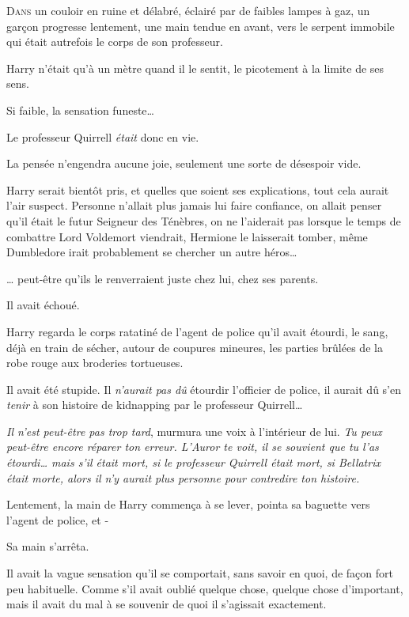 
\lettrine{D}{ans} un couloir en ruine et délabré, éclairé par de faibles lampes à gaz, un garçon progresse lentement, une main tendue en avant, vers le serpent immobile qui était autrefois le corps de son professeur.

Harry n'était qu'à un mètre quand il le sentit, le picotement à la limite de ses sens.

Si faible, la sensation funeste…

Le professeur Quirrell \emph{était} donc en vie.

La pensée n'engendra aucune joie, seulement une sorte de désespoir vide.

Harry serait bientôt pris, et quelles que soient ses explications, tout cela aurait l'air suspect. Personne n'allait plus jamais lui faire confiance, on allait penser qu'il était le futur Seigneur des Ténèbres, on ne l'aiderait pas lorsque le temps de combattre Lord Voldemort viendrait, Hermione le laisserait tomber, même Dumbledore irait probablement se chercher un autre héros…

… peut-être qu'ils le renverraient juste chez lui, chez ses parents.

Il avait échoué.

Harry regarda le corps ratatiné de l'agent de police qu'il avait étourdi, le sang, déjà en train de sécher, autour de coupures mineures, les parties brûlées de la robe rouge aux broderies tortueuses.

Il avait été stupide. Il \emph{n'aurait pas dû} étourdir l'officier de police, il aurait dû s'en \emph{tenir} à son histoire de kidnapping par le professeur Quirrell…

\emph{Il n'est peut-être pas trop tard}, murmura une voix à l'intérieur de lui. \emph{Tu peux peut-être encore réparer ton erreur. L'Auror te voit, il se souvient que tu l'as étourdi… mais s'il était mort, si le professeur Quirrell était mort, si Bellatrix était morte, alors il n'y aurait plus personne pour contredire ton histoire.}

Lentement, la main de Harry commença à se lever, pointa sa baguette vers l'agent de police, et -

Sa main s'arrêta.

Il avait la vague sensation qu'il se comportait, sans savoir en quoi, de façon fort peu habituelle. Comme s'il avait oublié quelque chose, quelque chose d'important, mais il avait du mal à se souvenir de quoi il s'agissait exactement.

